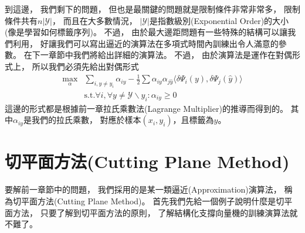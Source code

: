   到這邊，
  我們剩下的問題，
  但也是最關鍵的問題就是限制條件非常非常多，
  限制條件共有$n \vert \mathcal{Y} \vert$，
  而且在大多數情況，
  $\vert \mathcal{Y} \vert$是指數級別(Exponential Order)的大小
  (像是學習如何標籤序列)。
  不過，
  由於最大邊距問題有一些特殊的結構可以讓我們利用，
  好讓我們可以寫出逼近的演算法在多項式時間內訓練出令人滿意的參數。
  在下一章節中我們將給出詳細的演算法。
  不過，
  由於演算法是運作在對偶形式上，
  所以我們必須先給出對偶形式
  \begin{equation}
    \begin{split}
      \max_{\alpha} &\sum_{i, y \neq y_i} \alpha_{iy} - \frac{1}{2} \sum
      \alpha_{iy} \alpha_{j\hat{y}} \langle \delta \Psi_i(y), \delta \Psi_j(\hat{y}) \rangle \\
      &\text{s.t.} \forall i, \forall y \neq \mathcal{Y} \backslash y_i: \alpha_{iy} \geq 0
    \end{split}
  \end{equation}
  這邊的形式都是根據前一章拉氏乘數法(Lagrange Multiplier)的推導而得到的。
  其中$\alpha_{iy}$是我們的拉氏乘數，
  對應於樣本$(x_i, y_i)$，且標籤為$y$。

\section{切平面方法(Cutting Plane Method)}
  要解前一章節中的問題，
  我們採用的是某一類逼近(Approximation)演算法，
  稱為切平面方法(Cutting Plane Method)。
  首先我們先給一個例子說明什麼是切平面方法，
  只要了解到切平面方法的原則，
  了解結構化支撐向量機的訓練演算法就不難了。

